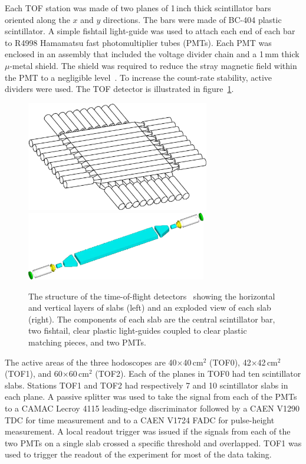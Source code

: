 Each TOF station was made of two planes of 1\,inch thick scintillator
bars oriented along the $x$ and $y$ directions. 
The bars were made of BC-404 plastic scintillator.
A simple fishtail light-guide was used to attach each end of each bar
to R4998 Hamamatsu fast photomultiplier tubes (PMTs).
Each PMT was enclosed in an assembly that included the voltage divider
chain and a 1\,mm thick $\mu$-metal shield.
The shield was required to reduce the stray magnetic field within the
PMT to a negligible level~\cite{2010NIMPA.615...14B}.
To increase the count-rate stability, active dividers were used.
The TOF detector is illustrated in figure~\ref{fig:tof:schematic}.
\begin{figure}[!htb]
  \begin{center}
    \includegraphics[width=8cm]{tof_diagram2}
    \includegraphics[height=3cm]{slab_design2}
  \end{center}
  \caption{
    The structure of the time-of-flight
    detectors~\cite{2010NIMPA.615...14B,NOTE145} showing the
    horizontal and vertical layers of slabs (left) and an exploded
    view of each slab (right). 
    The components of each slab are the central scintillator bar, two
    fishtail, clear plastic light-guides coupled to clear plastic
    matching pieces, and two PMTs.
  }
  \label{fig:tof:schematic}
\end{figure}

The active areas of the three hodoscopes are 40$\times$40\,cm$^2$
(TOF0), 42$\times$42\,cm$^2$ (TOF1), and 60$\times$60\,cm$^2$ (TOF2).
Each of the planes in TOF0 had ten scintillator slabs.
Stations TOF1 and TOF2 had respectively 7 and 10 scintillator slabs in each plane.
A passive splitter was used to take the signal from each of the PMTs
to a CAMAC Lecroy 4115 leading-edge discriminator followed by a CAEN
V1290 TDC for time measurement and to a CAEN V1724 FADC for
pulse-height measurement.
A local readout trigger was issued if the signals from each of the two
PMTs on a single slab crossed a specific threshold and overlapped.
TOF1 was used to trigger the readout of the experiment for most of the
data taking. \\

